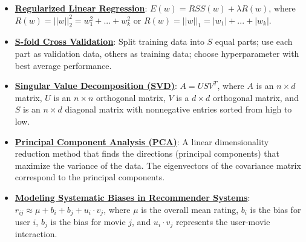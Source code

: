 \documentclass{article}%
\begin{document}
\begin{itemize}[leftmargin=*]%
\item \href{https://purdue.brightspace.com/d2l/common/assets/pdfjs-d2l-dist/1.0.14-legacy/web/viewer.html?file=%2Fcontent%2Fenforced%2F1095467-wl.202510.CS.24300.001%2F10L1-CrossValidation.pdf%3Fou%3D1095467&lang=en-us&container=d2l-fileviewer-rendered-pdf&fullscreen=d2l-fileviewer-rendered-pdf-dialog&height=667#page=17}{\textbf{Regularized Linear Regression}}: $E(w) = RSS(w) + \lambda R(w)$, where $R(w) = ||w||_2^2 = w_1^2 + ... + w_k^2$ or $R(w) = ||w||_1 = |w_1| + ... + |w_k|$.%
\item \href{https://purdue.brightspace.com/d2l/common/assets/pdfjs-d2l-dist/1.0.14-legacy/web/viewer.html?file=%2Fcontent%2Fenforced%2F1095467-wl.202510.CS.24300.001%2F10L1-CrossValidation.pdf%3Fou%3D1095467&lang=en-us&container=d2l-fileviewer-rendered-pdf&fullscreen=d2l-fileviewer-rendered-pdf-dialog&height=667#page=25}{\textbf{S{-}fold Cross Validation}}: Split training data into $S$ equal parts; use each part as validation data, others as training data; choose hyperparameter with best average performance.%
\end{itemize}%
\begin{itemize}[leftmargin=*]%
\item \href{https://purdue.brightspace.com/d2l/common/assets/pdfjs-d2l-dist/1.0.14-legacy/web/viewer.html?file=%2Fcontent%2Fenforced%2F1095467-wl.202510.CS.24300.001%2F11L2-svd-pca-recommender.pdf%3Fou%3D1095467&lang=en-us&container=d2l-fileviewer-rendered-pdf&fullscreen=d2l-fileviewer-rendered-pdf-dialog&height=667#page=10}{\textbf{Singular Value Decomposition (SVD)}}: $A = USV^T$, where $A$ is an $n \times d$ matrix, $U$ is an $n \times n$ orthogonal matrix, $V$ is a $d \times d$ orthogonal matrix, and $S$ is an $n \times d$ diagonal matrix with nonnegative entries sorted from high to low.%
\item \href{https://purdue.brightspace.com/d2l/common/assets/pdfjs-d2l-dist/1.0.14-legacy/web/viewer.html?file=%2Fcontent%2Fenforced%2F1095467-wl.202510.CS.24300.001%2F11L2-svd-pca-recommender.pdf%3Fou%3D1095467&lang=en-us&container=d2l-fileviewer-rendered-pdf&fullscreen=d2l-fileviewer-rendered-pdf-dialog&height=667#page=15}{\textbf{Principal Component Analysis (PCA)}}: A linear dimensionality reduction method that finds the directions (principal components) that maximize the variance of the data. The eigenvectors of the covariance matrix correspond to the principal components.%
\item \href{https://purdue.brightspace.com/d2l/common/assets/pdfjs-d2l-dist/1.0.14-legacy/web/viewer.html?file=%2Fcontent%2Fenforced%2F1095467-wl.202510.CS.24300.001%2F11L2-svd-pca-recommender.pdf%3Fou%3D1095467&lang=en-us&container=d2l-fileviewer-rendered-pdf&fullscreen=d2l-fileviewer-rendered-pdf-dialog&height=667#page=44}{\textbf{Modeling Systematic Biases in Recommender Systems}}: $r_{ij} \approx \mu + b_i + b_j + u_i \cdot v_j$, where $\mu$ is the overall mean rating, $b_i$ is the bias for user $i$, $b_j$ is the bias for movie $j$, and $u_i \cdot v_j$ represents the user-movie interaction.%
\end{itemize}%
\end{document}
